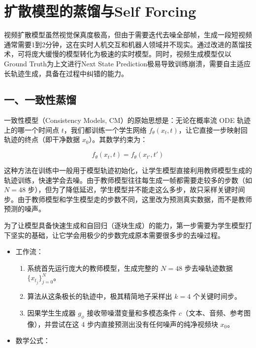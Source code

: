 \clearpage

\hypertarget{ux6269ux6563ux6a21ux578bux7684ux84b8ux998fux4e0eself-forcing}{%
\section{扩散模型的蒸馏与Self Forcing}\label{ux6269ux6563ux6a21ux578bux7684ux84b8ux998fux4e0eself-forcing}}

视频扩散模型虽然视觉保真度极高，但由于需要迭代去噪全部帧，生成一段短视频通常需要1到2分钟，这在实时人机交互和机器人领域并不现实。通过改进的蒸馏技术，可将庞大缓慢的模型转化为极速的实时模型。同时，视频生成模型仅以Ground Truth为上文进行Next State Prediction极易导致训练崩溃，需要自主适应长轨迹生成，具备在过程中纠错的能力。

\hypertarget{ux4e00ux4e00ux81f4ux6027ux84b8ux998f}{%
\subsection{一、一致性蒸馏}\label{ux4e00ux4e00ux81f4ux6027ux84b8ux998f}}

一致性模型（Consistency Models, CM）的原始思想是：无论在概率流 ODE 轨迹上的哪一个时间点 \(t\)，我们都训练一个学生网络 \(f_\theta(x_t,t)\)，让它直接一步映射回轨迹的终点（即干净数据 \(x_0\)）。其数学约束为：

\[
f_\theta(x_t,t)=f_\theta(x_{t'},t')
\]

这种方法在训练中一般用于模型轨迹初始化，让学生模型直接利用教师模型生成的轨迹训练，快速学会去噪。由于教师模型往往每生成一帧都需要走较多的步数（如 \(N=48\) 步），但为了降低延迟，学生模型并不能走这么多步，故只采样关键时间步。由于教师模型和学生模型走的步数不同，这里改为预测真实数据，而不是教师预测的噪声。

为了让模型具备快速生成和自回归（逐块生成）的能力，第一步需要为学生模型打下坚实的基础，让它学会用极少的步数完成原本需要很多步的去噪过程。

\begin{itemize}
\tightlist
\item
  工作流：

  \begin{enumerate}
  \def\labelenumi{\arabic{enumi}.}
  \tightlist
  \item
    系统首先运行庞大的教师模型，生成完整的 \(N=48\) 步去噪轨迹数据 \(\{x_{t_j}\}_{j=0}^{N}\)。
  \item
    算法从这条极长的轨迹中，极其精简地子采样出 \(k=4\) 个关键时间步。
  \item
    因果学生生成器 \(g_\phi\) 接收带噪潜变量和多模态条件 \(c\)（文本、音频、参考图像），并尝试在这 4 步内直接预测出没有任何噪声的纯净视频块 \(x_0\)。
  \end{enumerate}
\item
  数学公式：
\end{itemize}


